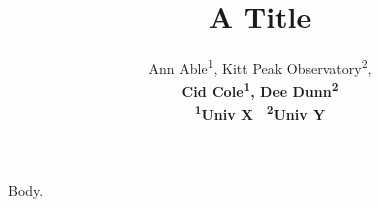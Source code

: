 \documentclass{article}
\begin{document}
\title{A Title}
\author{Ann Able\textsuperscript{\rm 1}, Kitt Peak Observatory\textsuperscript{\rm 2}, \\ \bf \Large \textbf{Cid Cole\textsuperscript{\rm 1}, Dee Dunn\textsuperscript{\rm 2}}\\
\textsuperscript{\rm 1}Univ X \
\textsuperscript{\rm 2}Univ Y}
\maketitle
Body.
\end{document}
